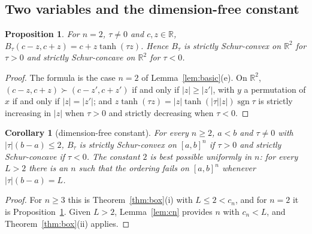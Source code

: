 \documentclass[11pt,a4paper]{article}
\theoremstyle{plain}
\newtheorem{proposition}[theorem]{Proposition}
\newtheorem{corollary}[theorem]{Corollary}
\theoremstyle{definition}
\newcommand{\R}{\mathbb{R}}
\DeclareMathOperator{\sgn}{sgn}
\newcommand{\maj}{\succ}
\begin{document}
\subsection{Two variables and the dimension-free constant}

\begin{proposition}\label{prop:n2}
For $n=2$, $\tau\ne 0$ and $c,z\in\R$, $B_\tau(c-z,c+z)=c+z\tanh(\tau z)$. Hence $B_\tau$ is strictly Schur-convex on $\R^2$ for $\tau>0$ and strictly Schur-concave on $\R^2$ for $\tau<0$.
\end{proposition}

\begin{proof}
The formula is the case $n=2$ of Lemma~\ref{lem:basic}(e). On $\R^2$, $(c-z,c+z)\maj(c-z',c+z')$ if and only if $|z|\ge|z'|$, with $y$ a permutation of $x$ if and only if $|z|=|z'|$; and $z\tanh(\tau z)=|z|\tanh(|\tau||z|)\sgn\tau$ is strictly increasing in $|z|$ when $\tau>0$ and strictly decreasing when $\tau<0$.
\end{proof}

\begin{corollary}[dimension-free constant]\label{cor:dimfree}
For every $n\ge 2$, $a<b$ and $\tau\ne0$ with $|\tau|(b-a)\le 2$, $B_\tau$ is strictly Schur-convex on $[a,b]^n$ if $\tau>0$ and strictly Schur-concave if $\tau<0$. The constant $2$ is best possible uniformly in $n$: for every $L>2$ there is an $n$ such that the ordering fails on $[a,b]^n$ whenever $|\tau|(b-a)=L$.
\end{corollary}

\begin{proof}
For $n\ge 3$ this is Theorem~\ref{thm:box}(i) with $L\le 2<c_n$, and for $n=2$ it is Proposition~\ref{prop:n2}. Given $L>2$, Lemma~\ref{lem:cn} provides $n$ with $c_n<L$, and Theorem~\ref{thm:box}(ii) applies.
\end{proof}
\end{document}
